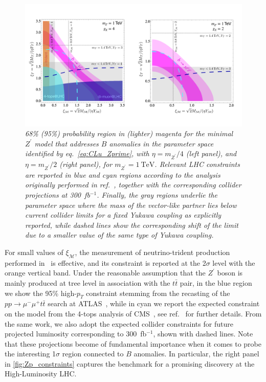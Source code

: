 \begin{figure}[tp]
	\includegraphics[scale=0.235]{figures/Zprime_constraint_CLu.pdf}
	\caption{\it 68\% (95\%) probability region in (lighter) magenta for the minimal $Z^{\prime}$ model that addresses $B$ anomalies in the parameter space identified by eq.~\eqref{eq:CLu_Zprime}, with $\eta = m_{Z^{\prime}}/4$ (left panel), and $\eta =  m_{Z^{\prime}}/2$ (right panel), for $m_{Z^{\prime}} = 1~\textrm{TeV}$. Relevant LHC constraints are reported in blue and cyan regions according to the analysis originally performed in ref.~\cite{Camargo-Molina:2018cwu}, together with the corresponding collider projections at 300~fb$^{-1}$. Finally, the gray regions underlie the parameter space where the mass of the vector-like partner lies below current collider limits for a fixed Yukawa coupling as explicitly reported, while dashed lines show the corresponding shift of the limit due to a smaller value of the same type of Yukawa coupling.}    
	\label{fig:Zp_constraints}
\end{figure}

For small values of $\xi_{\mathcal{M}}$, the measurement of neutrino-trident production performed in~\cite{Mishra:1991bv} is effective, and its constraint is reported at the 2$\sigma$ level with the orange vertical band.
Under the reasonable assumption that the $Z^{\prime}$ boson is mainly produced at tree level in association with the $ t \bar{t}$ pair, in the blue region we show the 95\% high-$p_{T}$ constraint stemming from the recasting of the $p p \to \mu^{-} \mu^{+} t \bar{t}  $ search at ATLAS~\cite{Aaboud:2017buh}, while in cyan we report the expected constraint on the model from the 4-tops analysis of CMS~\cite{Sirunyan:2017roi}, see ref.~\cite{Camargo-Molina:2018cwu} for further details. From the same work, we also adopt the expected collider constraints for future projected luminosity corresponding to 300~fb$^{-1}$, shown with dashed lines.  Note that these projections become of fundamental importance when it comes to probe the interesting 1$\sigma$ region connected to $B$ anomalies. 
In particular, the right panel in \autoref{fig:Zp_constraints} captures the benchmark for a promising discovery at the High-Luminosity LHC.


